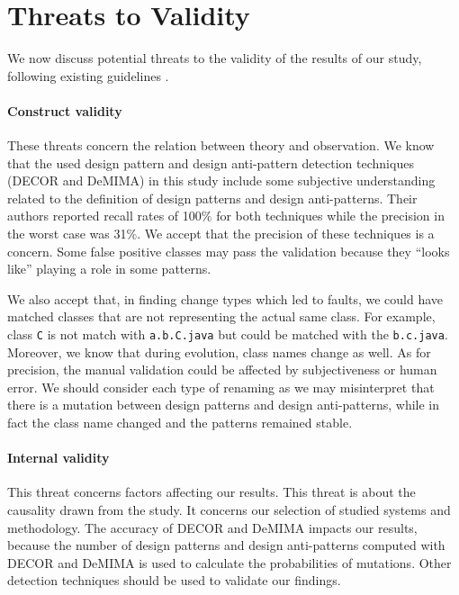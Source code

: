 \section{Threats to Validity}
\label{sec:Treats to Validity}

We now discuss potential threats to the validity of the results of our study, following existing guidelines \cite{yin2013case,wohlin2012experimentation}.


\paragraph{Construct validity} These threats concern the relation between theory and observation. We know that the used design pattern and design anti-pattern detection techniques (DECOR and DeMIMA) in this study include some subjective understanding related to the definition of design patterns and design anti-patterns. Their authors reported recall rates of 100$\%$ for both techniques while the precision in the worst case was 31$\%$. We accept that the precision of these techniques is a concern. Some false positive classes may pass the validation because they ``looks like'' playing a role in some patterns.

We also accept that, in finding change types which led to faults, we could have matched classes that are not representing the actual same class. For example, class \texttt{C} is not match with \texttt{a.b.C.java} but could be matched with the \texttt{b.c.java}. Moreover, we know that during evolution, class names change as well. As for precision, the manual validation could be affected by subjectiveness or human error.  We should consider each type of renaming as we may misinterpret that there is a mutation between design patterns and design anti-patterns, while in fact the class name changed and the patterns remained stable. 



\paragraph{Internal validity} This threat concerns factors affecting our results. This threat is about the causality drawn from the study. It concerns our selection of studied systems and methodology. The accuracy of DECOR and DeMIMA impacts our results, because the number of design patterns and design anti-patterns computed with DECOR and DeMIMA is used to calculate the probabilities of mutations. Other detection techniques should be used to validate our findings.

